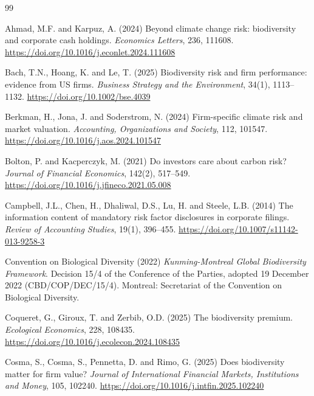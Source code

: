\documentclass[12pt,a4paper]{article}
\begin{document}
\begin{thebibliography}{99}
\setlength{\itemsep}{2pt}

 Ahmad, M.F. and Karpuz, A. (2024) Beyond climate change risk: biodiversity and corporate cash holdings. \emph{Economics Letters}, 236, 111608. \url{https://doi.org/10.1016/j.econlet.2024.111608}

 Bach, T.N., Hoang, K. and Le, T. (2025) Biodiversity risk and firm performance: evidence from US firms. \emph{Business Strategy and the Environment}, 34(1), 1113--1132. \url{https://doi.org/10.1002/bse.4039}

 Berkman, H., Jona, J. and Soderstrom, N. (2024) Firm-specific climate risk and market valuation. \emph{Accounting, Organizations and Society}, 112, 101547. \url{https://doi.org/10.1016/j.aos.2024.101547}

 Bolton, P. and Kacperczyk, M. (2021) Do investors care about carbon risk? \emph{Journal of Financial Economics}, 142(2), 517--549. \url{https://doi.org/10.1016/j.jfineco.2021.05.008}

 Campbell, J.L., Chen, H., Dhaliwal, D.S., Lu, H. and Steele, L.B. (2014) The information content of mandatory risk factor disclosures in corporate filings. \emph{Review of Accounting Studies}, 19(1), 396--455. \url{https://doi.org/10.1007/s11142-013-9258-3}

 Convention on Biological Diversity (2022) \emph{Kunming-Montreal Global Biodiversity Framework}. Decision 15/4 of the Conference of the Parties, adopted 19 December 2022 (CBD/COP/DEC/15/4). Montreal: Secretariat of the Convention on Biological Diversity.

 Coqueret, G., Giroux, T. and Zerbib, O.D. (2025) The biodiversity premium. \emph{Ecological Economics}, 228, 108435. \url{https://doi.org/10.1016/j.ecolecon.2024.108435}

 Cosma, S., Cosma, S., Pennetta, D. and Rimo, G. (2025) Does biodiversity matter for firm value? \emph{Journal of International Financial Markets, Institutions and Money}, 105, 102240. \url{https://doi.org/10.1016/j.intfin.2025.102240}


\end{thebibliography}
\end{document}

